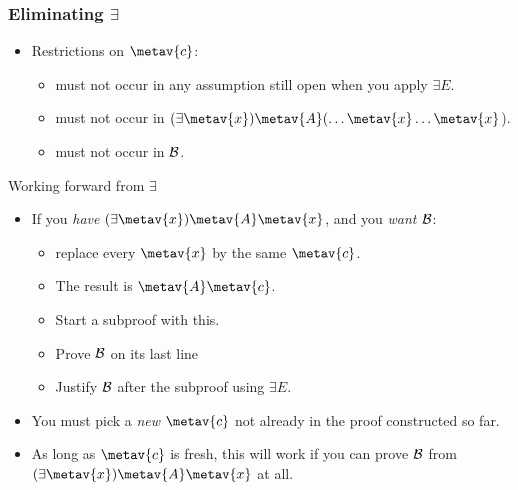 \begin{frame}
  \frametitle{Eliminating $\exists$}
  \begin{fitchproof}
    \open
    \close
  \end{fitchproof}

  \begin{itemize}[<+->]
    \item Restrictions on $\metav{c}$:
    \begin{itemize}[<+->]
      \item must not occur in any assumption still open when you apply
      $\exists E$.
      \item must not occur in $\qt{\exists}{\metav{x}}\metav{A}(\ldots \metav{x} \ldots \metav{x}$).
      \item must not occur in $\mathcal{B}$.
    \end{itemize}
  \end{itemize}
  \end{frame}

  \begin{frame}{Working forward from $\exists$}

  \begin{itemize}[<+->]
    \item If you \emph{have $\qt{\exists}{\metav{x}}\metav{A}\qv{\metav{x}}$}, and you \emph{want  $\mathcal{B}$}:
      \begin{itemize}
        \item replace every $\metav{x}$ by the
        same $\metav{c}$.
        \item The result is $\metav{A}\qv{\metav{c}}$.
        \item Start a subproof with this.
        \item Prove $\mathcal{B}$ on its last line
        \item Justify $\mathcal{B}$ after the subproof using $\exists E$.
        \end{itemize}
    \item You must pick a \emph{new} $\metav{c}$ not already in the
    proof constructed so far.
    \item As long as $\metav{c}$ is fresh, this will work if you can
    prove $\mathcal{B}$ from $\qt{\exists}{\metav{x}}\metav{A}\qv{\metav{x}}$ at all.
    \end{itemize}
\end{frame}

